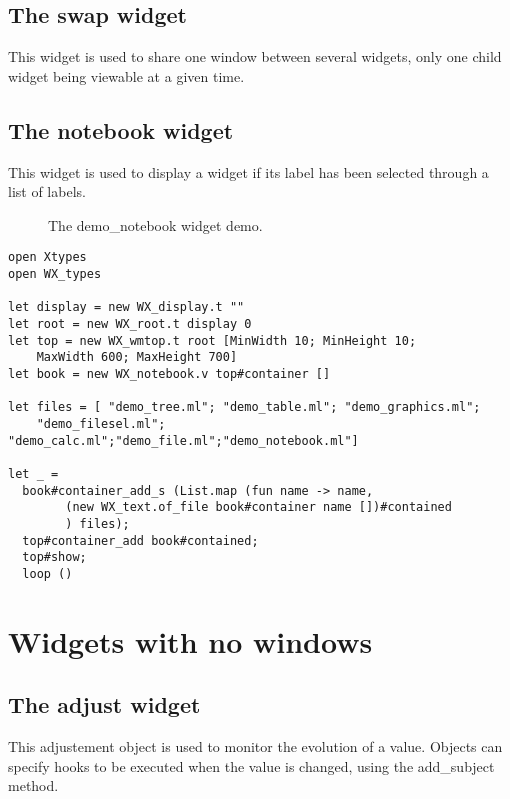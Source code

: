 \documentclass{report}
\newcommand{\psfigure}[3]{ %
  \begin{quote}\let\normalsize\small\caption{#3\label{fig:#2}}\end{quote}
  }
\begin{document}
\subsection{The {\sf swap} widget}

  This widget is used to share one window between several widgets, only 
one child widget being viewable at a given time.

\subsection{The {\sf notebook} widget}

 This widget is used to display a widget if its label has been selected 
through a list of labels.

\begin{figure}[t]
\begin{center}
\psfigure{1}{notebook}{The demo\_notebook widget demo.}
\end{center}
\end{figure}

\begin{verbatim}
open Xtypes
open WX_types
  
let display = new WX_display.t ""
let root = new WX_root.t display 0
let top = new WX_wmtop.t root [MinWidth 10; MinHeight 10; 
    MaxWidth 600; MaxHeight 700]
let book = new WX_notebook.v top#container []
  
let files = [ "demo_tree.ml"; "demo_table.ml"; "demo_graphics.ml";
    "demo_filesel.ml"; "demo_calc.ml";"demo_file.ml";"demo_notebook.ml"]
  
let _ =  
  book#container_add_s (List.map (fun name -> name,
        (new WX_text.of_file book#container name [])#contained
        ) files);
  top#container_add book#contained;
  top#show;
  loop ()
\end{verbatim}

\section{Widgets with no windows}

\subsection{The {\sf adjust} widget}

  This adjustement object is used to monitor the evolution of a value.
Objects can specify hooks to be executed when the value is changed, using 
the {\sf add\_subject} method.
\end{document}
